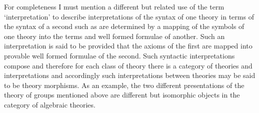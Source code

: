 \note For completeness I must mention a different but related use of the term `interpretation' to describe interpretations of the syntax of one theory in terms of the syntax of a second
such as are determined by a mapping of the symbols of one theory into the terms and well formed formulae of another. 
Such an interpretation is said to be  provided that the axioms of the first are mapped into provable well formed formulae of the second.  Such syntactic interpretations compose and therefore for each class of theory there is a category of theories and interpretations and accordingly such 
interpretations between theories may be said to be theory morphisms.
As an example, the two different presentations of the theory of groups mentioned above are different but isomorphic objects in the category of algebraic theories. 

